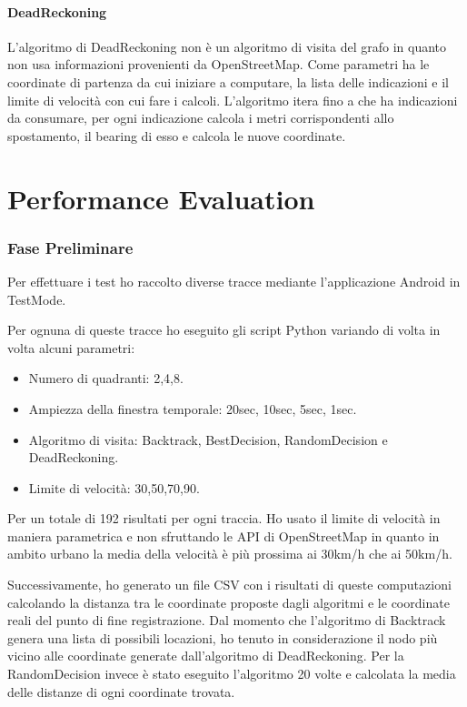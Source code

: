 \documentclass[12pt,a4paper,openright,twoside]{report}
\begin{document}
\subsubsection{DeadReckoning}
L'algoritmo di DeadReckoning non è un algoritmo di visita del grafo in quanto non usa informazioni provenienti da OpenStreetMap. Come parametri ha le coordinate di partenza da cui iniziare a computare, la lista delle indicazioni e il limite di velocità con cui fare i calcoli.
L'algoritmo itera fino a che ha indicazioni da consumare, per ogni indicazione calcola i metri corrispondenti allo spostamento, il bearing di esso e calcola le nuove coordinate.


\clearpage{\pagestyle{empty}\cleardoublepage}
\chapter{Performance Evaluation}                %
\lhead[\fancyplain{}{\bfseries\thepage}]{\fancyplain{}{\bfseries\rightmark}}
\subsection{Fase Preliminare}
Per effettuare i test ho raccolto diverse tracce mediante l'applicazione Android in TestMode.

Per ognuna di queste tracce ho eseguito gli script Python variando di volta in volta alcuni parametri:
\begin{itemize}
\item Numero di quadranti: 2,4,8.
\item Ampiezza della finestra temporale: 20sec, 10sec, 5sec, 1sec.
\item Algoritmo di visita: Backtrack, BestDecision, RandomDecision e DeadReckoning.
\item Limite di velocità: 30,50,70,90.
\end{itemize}
Per un totale di 192 risultati per ogni traccia.
Ho usato il limite di velocità in maniera parametrica e non sfruttando le API di OpenStreetMap in quanto in ambito urbano la media della velocità è più prossima ai 30km/h che ai 50km/h.

Successivamente, ho generato un file CSV con i risultati di queste computazioni calcolando la distanza tra le coordinate proposte dagli algoritmi e le coordinate reali del punto di fine registrazione.
Dal momento che l'algoritmo di Backtrack genera una lista di possibili locazioni, ho tenuto in considerazione il nodo più vicino alle coordinate generate dall'algoritmo di DeadReckoning.
Per la RandomDecision invece è stato eseguito l'algoritmo 20 volte e calcolata la media delle distanze di ogni coordinate trovata.
\end{document}

